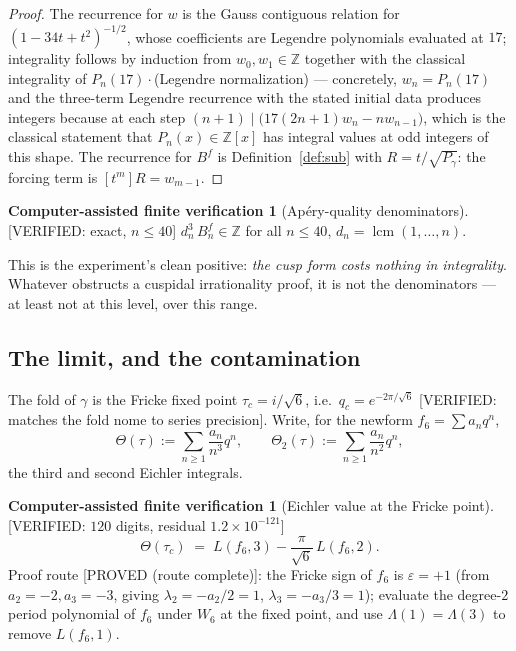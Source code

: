 \documentclass[11pt,reqno]{amsart}
\theoremstyle{plain}
\theoremstyle{definition}
\newtheorem{verification}[theorem]{Computer-assisted finite verification}
\theoremstyle{remark}
\newcommand{\Z}{\mathbb{Z}}
\newcommand{\ProvedS}{\textup{\textsf{[PROVED (route complete)]}}}
\newcommand{\VerifiedR}[1]{\textup{\textsf{[VERIFIED: #1]}}}
\begin{document}
\begin{proof}
The recurrence for $w$ is the Gauss contiguous relation for
$(1-34t+t^2)^{-1/2}$, whose coefficients are Legendre polynomials
evaluated at $17$; integrality follows by induction from $w_0,w_1\in\Z$
together with the classical integrality of $P_n(17)\cdot$(Legendre
normalization) --- concretely, $w_n=P_n(17)$ and the three-term Legendre
recurrence with the stated initial data produces integers because at each
step $(n+1)\mid\bigl(17(2n+1)w_n-nw_{n-1}\bigr)$, which is the
classical statement that $P_n(x)\in\Z[x]$ has integral values at odd
integers of this shape. The recurrence for $B^f$ is
Definition~\ref{def:sub} with $R=t/\sqrt{P_\gamma}$: the forcing term is
$[t^m]R=w_{m-1}$.
\end{proof}

\begin{verification}[Ap\'ery-quality denominators]\label{ver:den6}
\VerifiedR{exact, $n\le40$} $d_n^3\,B^f_n\in\Z$ for all $n\le40$,
$d_n=\operatorname{lcm}(1,\dots,n)$.
\end{verification}

This is the experiment's clean positive: \emph{the cusp form costs nothing
in integrality}. Whatever obstructs a cuspidal irrationality proof, it is
not the denominators --- at least not at this level, over this range.

\subsection{The limit, and the contamination}
The fold of $\gamma$ is the Fricke fixed point $\tau_c=i/\sqrt6$, i.e.\
$q_c=e^{-2\pi/\sqrt6}$ \VerifiedR{matches the fold nome to series
precision}. Write, for the newform $f_6=\sum a_nq^n$,
\[
\Theta(\tau):=\sum_{n\ge1}\frac{a_n}{n^3}q^n,\qquad
\Theta_2(\tau):=\sum_{n\ge1}\frac{a_n}{n^2}q^n ,
\]
the third and second Eichler integrals.

\begin{verification}[Eichler value at the Fricke point]\label{ver:theta6}
\VerifiedR{$120$ digits, residual $1.2\times10^{-121}$}
\[
\Theta(\tau_c)\;=\;L(f_6,3)-\frac{\pi}{\sqrt6}\,L(f_6,2).
\]
Proof route \ProvedS: the Fricke sign of $f_6$ is $\varepsilon=+1$ (from
$a_2=-2,a_3=-3$, giving $\lambda_2=-a_2/2=1$, $\lambda_3=-a_3/3=1$);
evaluate the degree-$2$ period polynomial of $f_6$ under $W_6$ at the fixed
point, and use $\Lambda(1)=\Lambda(3)$ to remove $L(f_6,1)$.
\end{verification}
\end{document}

